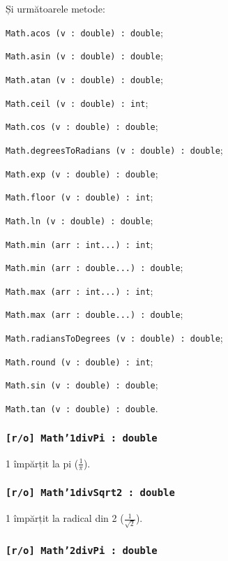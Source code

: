 Și următoarele metode:
\begin{icItems}
	\item \texttt{Math.acos (v : double) : double};
	\item \texttt{Math.asin (v : double) : double};
	\item \texttt{Math.atan (v : double) : double};
	\item \texttt{Math.ceil (v : double) : int};
	\item \texttt{Math.cos (v : double) : double};
	\item \texttt{Math.degreesToRadians (v : double) : double};
	\item \texttt{Math.exp (v : double) : double};
	\item \texttt{Math.floor (v : double) : int};
	\item \texttt{Math.ln (v : double) : double};
	\item \texttt{Math.min (arr : int...) : int};
	\item \texttt{Math.min (arr : double...) : double};
	\item \texttt{Math.max (arr : int...) : int};
	\item \texttt{Math.max (arr : double...) : double};
	\item \texttt{Math.radiansToDegrees (v : double) : double};
	\item \texttt{Math.round (v : double) : int};
	\item \texttt{Math.sin (v : double) : double};
	\item \texttt{Math.tan (v : double) : double}.
\end{icItems}

\subsubsection{\texttt{[r/o] Math'1divPi : double}}

1 împărțit la pi ($\frac{1}{\pi}$).

\subsubsection{\texttt{[r/o] Math'1divSqrt2 : double}}

1 împărțit la radical din 2 ($\frac{1}{\sqrt{2}}$).

\subsubsection{\texttt{[r/o] Math'2divPi : double}}

